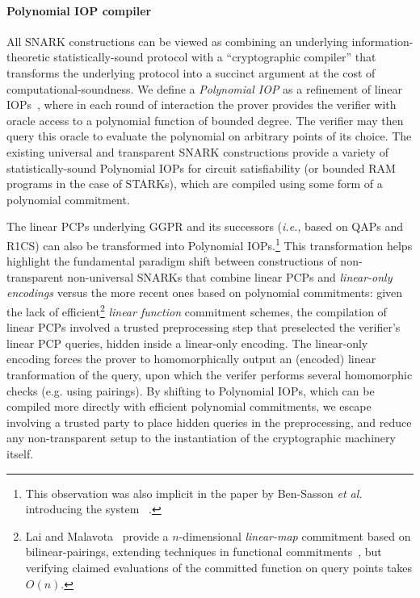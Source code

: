 \paragraph{Polynomial IOP compiler} %
All SNARK constructions can be viewed as combining an underlying information-theoretic statistically-sound protocol with a ``cryptographic compiler'' that transforms the underlying protocol into a succinct argument at the cost of computational-soundness. 
We define a \emph{Polynomial IOP} as a refinement of linear IOPs~\cite{CC:IKO07,C:BBCGI19}, where in each round of interaction the prover provides the verifier with oracle access to a polynomial function of bounded degree. The verifier may then query this oracle to evaluate the polynomial on arbitrary points of its choice. The existing universal and transparent SNARK constructions provide a variety of statistically-sound Polynomial IOPs for circuit satisfiability (or bounded RAM programs in the case of STARKs), which are compiled using some form of a polynomial commitment. 

The linear PCPs underlying GGPR and its successors (\emph{i.e.}, based on QAPs and R1CS) can also be transformed into Polynomial IOPs.\footnote{This observation was also implicit in the paper by Ben-Sasson \emph{et al.} introducing the system ~\cite{EC:BCRSVW19}.} This transformation helps highlight the fundamental paradigm shift between constructions of non-transparent non-universal SNARKs that combine linear PCPs and \emph{linear-only encodings} versus the more recent ones based on polynomial commitments: given the lack of efficient\footnote{Lai and Malavota~\cite{C:LaiMal19} provide a $n$-dimensional \emph{linear-map} commitment based on bilinear-pairings, extending techniques in functional commitments~\cite{ICALP:LibRamYun16}, but verifying claimed evaluations of the committed function on query points takes $O(n)$.} \emph{linear function} commitment schemes, the compilation of linear PCPs involved a trusted preprocessing step that preselected the verifier's linear PCP queries, hidden inside a linear-only encoding. The linear-only encoding forces the prover to homomorphically output an (encoded) linear tranformation of the query, upon which the verifer performs several homomorphic checks (e.g. using pairings). By shifting to Polynomial IOPs, which can be compiled more directly with efficient polynomial commitments, we escape involving a trusted party to place hidden queries in the preprocessing, and reduce any non-transparent setup to the instantiation of the cryptographic machinery itself.   

